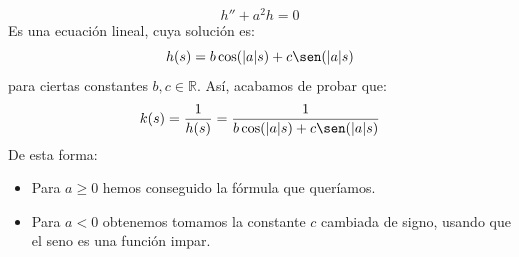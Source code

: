 \begin{ejercicio}
    \begin{equation*}
        h'' + a^2 h = 0
    \end{equation*}
    Es una ecuación lineal, cuya solución es:
    \begin{equation*}
        h(s) = b\cos(|a|s) + c\sen(|a|s)
    \end{equation*}
    para ciertas constantes $b,c\in \mathbb{R}$. Así, acabamos de probar que:
    \begin{equation*}
        k(s) = \frac{1}{h(s)} = \frac{1}{b\cos(|a|s) + c\sen(|a|s)}
    \end{equation*}
    De esta forma:
    \begin{itemize}
        \item Para $a\geq 0$ hemos conseguido la fórmula que queríamos.
        \item Para $a<0$ obtenemos tomamos la constante $c$ cambiada de signo, usando que el seno es una función impar.
    \end{itemize}
\end{ejercicio}

